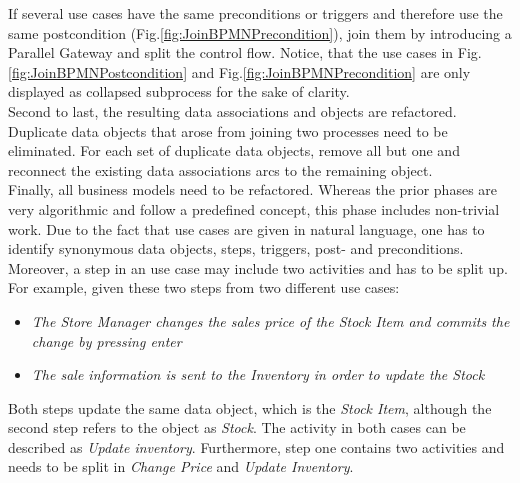 \noindent
If several use cases have the same preconditions or triggers and therefore use the same postcondition (Fig.\ref{fig:JoinBPMNPrecondition}), join them by introducing a Parallel Gateway and split the control flow. Notice, that the use cases in Fig.\ref{fig:JoinBPMNPostcondition} and Fig.\ref{fig:JoinBPMNPrecondition} are only displayed as collapsed subprocess for the sake of clarity. \\
Second to last, the resulting data associations and objects are refactored. Duplicate data objects that arose from joining two processes need to be eliminated. For each set of duplicate data objects, remove all but one and reconnect the existing data associations arcs to the remaining object. \\ 
Finally, all business models need to be refactored. Whereas the prior phases are very algorithmic and follow a predefined concept, this phase includes non-trivial work. Due to the fact that use cases are given in natural language, one has to identify synonymous data objects, steps, triggers, post- and preconditions. Moreover, a step in an use case may include two activities and has to be split up. For example, given these two steps from two different use cases:
\begin{itemize}
	\item \textit{The Store Manager changes the sales price of the Stock Item and commits the change by pressing enter}
	\item \textit{The sale information is sent to the Inventory in order to update the Stock}
\end{itemize}
Both steps update the same data object, which is the \textit{Stock Item}, although the second step refers to the object as \textit{Stock}. The activity in both cases can be described as \textit{Update inventory}. Furthermore, step one contains two activities and needs to be split in \textit{Change Price} and \textit{Update Inventory}.



